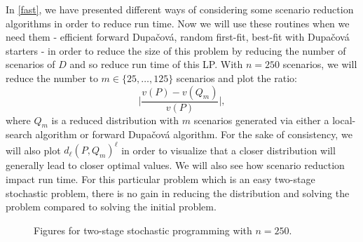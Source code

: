 \documentclass{amsart}
\begin{document}
In \ref{fast}, we have presented different ways of considering some scenario reduction algorithms in order to reduce run time. Now we will use these routines when we need them - efficient forward Dupačová, random first-fit, best-fit with Dupačová starters -  in order to reduce the size of this problem by reducing the number of scenarios of $D$ and so reduce run time of this LP. With $n=250$ scenarios, we will reduce the number to $m\in\{25,\hdots,125\}$ scenarios and plot the ratio: $$\lvert\frac{v(P)-v(Q_m)}{v(P)}\rvert,$$ where $Q_m$ is a reduced distribution with $m$ scenarios generated via either a local-search algorithm or forward Dupačová algorithm. For the sake of consistency, we will also plot $d_\ell\left(P,Q_m\right)^\ell$ in order to visualize that a closer distribution will generally lead to closer optimal values. We will also see how scenario reduction impact run time. For this particular problem which is an easy two-stage stochastic problem, there is no gain in reducing the distribution and solving the problem compared to solving the initial problem.

\begin{figure}[ht]
    \centering
    \hfill
    \hfill
    \caption{Figures for two-stage stochastic programming with $n=250$.}
\end{figure}
\end{document}
